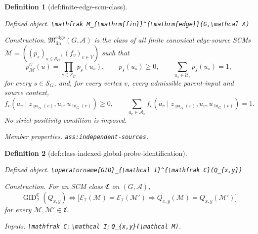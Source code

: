 \documentclass{article}
\newtheorem{definition}{Definition}
\begin{document}
\begin{definition}[def:finite-edge-scm-class]\label{def:finite-edge-scm-class}
\par\smallskip\noindent\emph{Defined object.} \texttt{\textbackslash{}\allowbreak{}mathfrak M\_\allowbreak{}\{\textbackslash{}\allowbreak{}mathrm\{fin\}\allowbreak{}\}\allowbreak{}\textasciicircum{}\{\textbackslash{}\allowbreak{}mathrm\{edge\}\allowbreak{}\}\allowbreak{}(G,\allowbreak{}\textbackslash{}\allowbreak{}mathcal A)}
\par\smallskip\noindent\emph{Construction.} \(\mathfrak M_{\mathrm{fin}}^{\mathrm{edge}}(G,\mathcal A)\) is the class of all finite canonical edge-source SCMs \(\mathcal M=((p_s)_{s\in\mathcal S_G},(f_v)_{v\in V})\) such that
\[
p_{\mathcal M}^{U}(u)=\prod_{s\in\mathcal S_G}p_s(u_s),\qquad
p_s(u_s)\geq0,\qquad
\sum_{u_s\in\mathcal U_s}p_s(u_s)=1,
\]
for every \(s\in\mathcal S_G\), and, for every vertex \(v\), every admissible parent-input and source context,
\[
f_v(a_v\mid z_{\operatorname{pa}_G(v)},u_v,u_{\operatorname{bi}_G(v)})\geq0,
\qquad
\sum_{a_v\in\mathcal A_v}f_v(a_v\mid z_{\operatorname{pa}_G(v)},u_v,u_{\operatorname{bi}_G(v)})=1.
\]
No strict-positivity condition is imposed.
\par\smallskip\noindent\emph{Member properties.} \texttt{ass:\allowbreak{}independent-\allowbreak{}sources}.
\end{definition}

\begin{definition}[def:class-indexed-global-probe-identification]\label{def:class-indexed-global-probe-identification}
\par\smallskip\noindent\emph{Defined object.} \texttt{\textbackslash{}\allowbreak{}operatorname\{GID\}\allowbreak{}\_\allowbreak{}\{\textbackslash{}\allowbreak{}mathcal I\}\allowbreak{}\textasciicircum{}\{\textbackslash{}\allowbreak{}mathfrak C\}\allowbreak{}(Q\_\allowbreak{}\{x,\allowbreak{}y\}\allowbreak{})}
\par\smallskip\noindent\emph{Construction.} For an SCM class \(\mathfrak C\) on \((G,\mathcal A)\),
\[
\operatorname{GID}_{\mathcal I}^{\mathfrak C}(Q_{x,y})
\Longleftrightarrow
\bigl[\mathcal E_{\mathcal I}(\mathcal M)=\mathcal E_{\mathcal I}(\mathcal M')
\Longrightarrow Q_{x,y}(\mathcal M)=Q_{x,y}(\mathcal M')\bigr]
\]
for every \(\mathcal M,\mathcal M'\in\mathfrak C\).
\par\smallskip\noindent\emph{Inputs.} \texttt{\textbackslash{}\allowbreak{}mathfrak C}; \texttt{\textbackslash{}\allowbreak{}mathcal I}; \texttt{Q\_\allowbreak{}\{x,\allowbreak{}y\}\allowbreak{}(\textbackslash{}\allowbreak{}mathcal M)}.
\end{definition}
\end{document}
